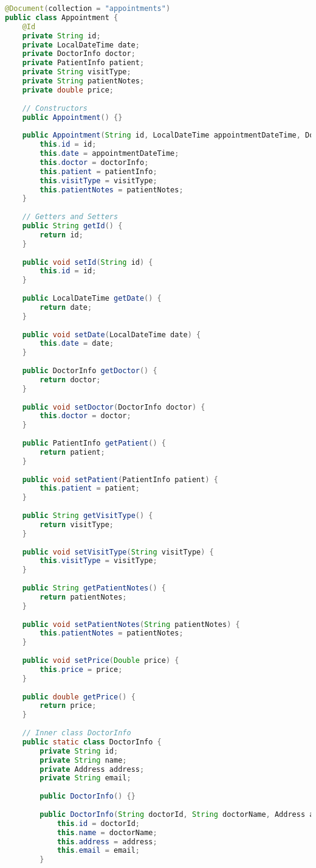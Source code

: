 \begin{lstlisting}[language=java]
@Document(collection = "appointments")
public class Appointment {
	@Id
	private String id;
	private LocalDateTime date;
	private DoctorInfo doctor;
	private PatientInfo patient;
	private String visitType;
	private String patientNotes;
	private double price;
	
	// Constructors
	public Appointment() {}
	
	public Appointment(String id, LocalDateTime appointmentDateTime, DoctorInfo doctorInfo, PatientInfo patientInfo, String visitType, String patientNotes) {
		this.id = id;
		this.date = appointmentDateTime;
		this.doctor = doctorInfo;
		this.patient = patientInfo;
		this.visitType = visitType;
		this.patientNotes = patientNotes;
	}
	
	// Getters and Setters
	public String getId() {
		return id;
	}
	
	public void setId(String id) {
		this.id = id;
	}
	
	public LocalDateTime getDate() {
		return date;
	}
	
	public void setDate(LocalDateTime date) {
		this.date = date;
	}
	
	public DoctorInfo getDoctor() {
		return doctor;
	}
	
	public void setDoctor(DoctorInfo doctor) {
		this.doctor = doctor;
	}
	
	public PatientInfo getPatient() {
		return patient;
	}
	
	public void setPatient(PatientInfo patient) {
		this.patient = patient;
	}
	
	public String getVisitType() {
		return visitType;
	}
	
	public void setVisitType(String visitType) {
		this.visitType = visitType;
	}
	
	public String getPatientNotes() {
		return patientNotes;
	}
	
	public void setPatientNotes(String patientNotes) {
		this.patientNotes = patientNotes;
	}
	
	public void setPrice(Double price) {
		this.price = price;
	}
	
	public double getPrice() {
		return price;
	}
	
	// Inner class DoctorInfo
	public static class DoctorInfo {
		private String id;
		private String name;
		private Address address;
		private String email;
		
		public DoctorInfo() {}
		
		public DoctorInfo(String doctorId, String doctorName, Address address, String email) {
			this.id = doctorId;
			this.name = doctorName;
			this.address = address;
			this.email = email;
		}
		

\end{lstlisting}
